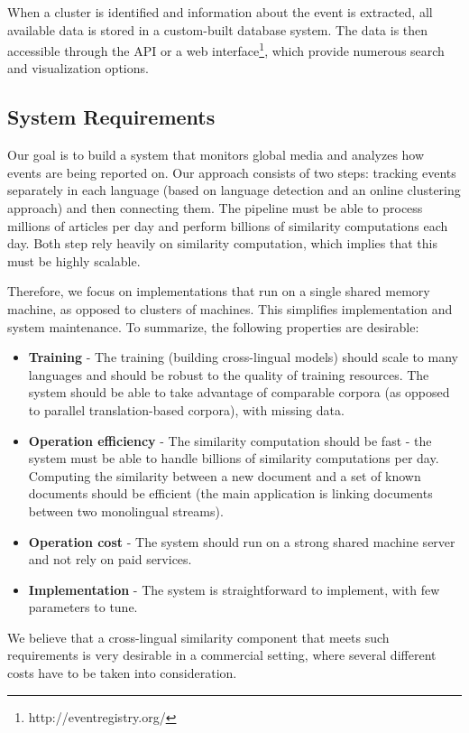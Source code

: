 \documentclass[twoside,11pt]{article}
\begin{document}
When a cluster is identified and information about the event is extracted, all available data is stored in a custom-built database system. The data is then accessible through the API or a web interface\footnote{http://eventregistry.org/}, which provide numerous search and visualization options.


\subsection{System Requirements}
\label{sec:sysreq}

Our goal is to build a system that monitors global media and analyzes how events are being reported on. Our approach consists of two steps: tracking events separately in each language (based on language detection and an online clustering approach) and then connecting them. The pipeline must be able to process millions of articles per day and perform billions of similarity computations each day. Both step rely heavily on similarity computation, which implies that this must be highly scalable.

Therefore, we focus on implementations that run on a single shared memory machine, as opposed to clusters of machines. This simplifies implementation and system maintenance.
To summarize, the following properties are desirable:
\begin{itemize}
\item \textbf{Training} - The training (building cross-lingual models) should scale to many languages and should be robust to the quality of training resources. The system should be able to take advantage of comparable corpora (as opposed to parallel translation-based corpora), with missing data.
\item \textbf{Operation efficiency} - The similarity computation should be fast - the system must be able to handle billions of similarity computations per day. Computing the similarity between a new document and a set of known documents should be efficient (the main application is linking documents between two monolingual streams).
\item \textbf{Operation cost} - The system should run on a strong shared machine server and not rely on paid services.
\item \textbf{Implementation} - The system is straightforward to implement, with few parameters to tune.
\end{itemize}
We believe that a cross-lingual similarity component that meets such requirements is very desirable in a commercial setting, where several different costs have to be taken into consideration.
\end{document}
